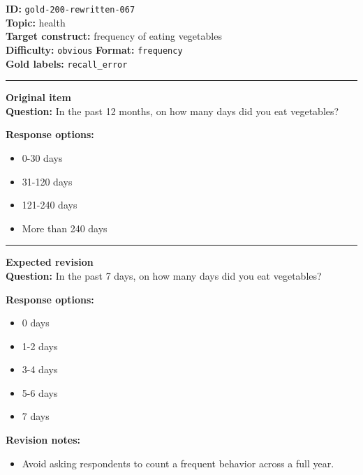 \documentclass[10pt,a4paper]{article}
\newcommand{\sectionline}{\vspace{0.15em}\hrule\vspace{0.35em}}
\begin{document}
\begin{tcolorbox}[colframe=FlawRed,colback=white,colbacktitle=FlawRed!9,coltitle=black,title={Item 067\hfill Flawed item}]
\textbf{ID:} \texttt{gold-200-rewritten-067}\\
\textbf{Topic:} health\\
\textbf{Target construct:} frequency of eating vegetables\\
\textbf{Difficulty:} \texttt{obvious} \quad \textbf{Format:} \texttt{frequency}\\
\textbf{Gold labels:} \texttt{recall\_error}\\
\sectionline
\textbf{Original item}\\
\textbf{Question:} In the past 12 months, on how many days did you eat vegetables?
\par\textbf{Response options:}
\begin{itemize}
\item 0-30 days
\item 31-120 days
\item 121-240 days
\item More than 240 days
\end{itemize}
\sectionline
\textbf{Expected revision}\\
\textbf{Question:} In the past 7 days, on how many days did you eat vegetables?
\par\textbf{Response options:}
\begin{itemize}
\item 0 days
\item 1-2 days
\item 3-4 days
\item 5-6 days
\item 7 days
\end{itemize}
\par\textbf{Revision notes:}
\begin{itemize}
\item Avoid asking respondents to count a frequent behavior across a full year.
\end{itemize}
\end{tcolorbox}
\end{document}
